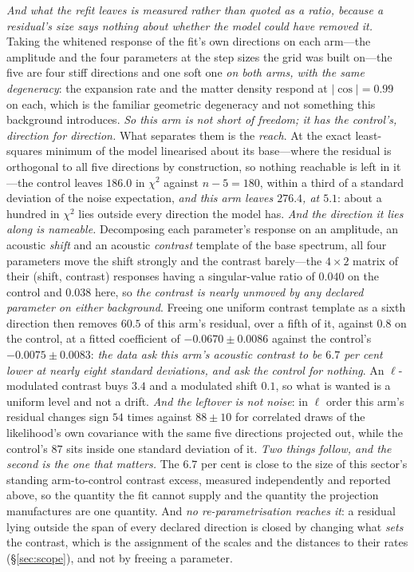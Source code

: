 \documentclass[11pt,a4paper]{article}
\theoremstyle{plain}
\theoremstyle{definition}
\theoremstyle{remark}
\begin{document}
\emph{And what the refit leaves is measured rather than quoted as a ratio, because a residual's size says
nothing about whether the model could have removed it.} Taking the whitened response of the fit's own
directions on each arm---the amplitude and the four parameters at the step sizes the grid was built on---the
five are four stiff directions and one soft one \emph{on both arms, with the same degeneracy}: the expansion
rate and the matter density respond at $\lvert\cos\rvert=0.99$ on each, which is the familiar geometric
degeneracy and not something this background introduces. \emph{So this arm is not short of freedom; it has the
control's, direction for direction.} What separates them is the \emph{reach}. At the exact least-squares
minimum of the model linearised about its base---where the residual is orthogonal to all five directions by
construction, so nothing reachable is left in it---the control leaves $186.0$ in $\chi^2$ against $n-5=180$,
within a third of a standard deviation of the noise expectation, \emph{and this arm leaves $276.4$, at
$5.1$}: about a hundred in $\chi^2$ lies outside every direction the model has. \emph{And the direction it
lies along is nameable.} Decomposing each parameter's response on an amplitude, an acoustic \emph{shift} and
an acoustic \emph{contrast} template of the base spectrum, all four parameters move the shift strongly and the
contrast barely---the $4\times2$ matrix of their (shift, contrast) responses having a singular-value ratio of
$0.040$ on the control and $0.038$ here, so \emph{the contrast is nearly unmoved by any declared parameter on
either background}. Freeing one uniform contrast template as a sixth direction then removes $60.5$ of this
arm's residual, over a fifth of it, against $0.8$ on the control, at a fitted coefficient of
$-0.0670\pm0.0086$ against the control's $-0.0075\pm0.0083$: \emph{the data ask this arm's acoustic contrast
to be $6.7$ per cent lower at nearly eight standard deviations, and ask the control for nothing}. An
$\ell$-modulated contrast buys $3.4$ and a modulated shift $0.1$, so what is wanted is a uniform level and not
a drift. \emph{And the leftover is not noise}: in $\ell$ order this arm's residual changes sign $54$ times
against $88\pm10$ for correlated draws of the likelihood's own covariance with the same five directions
projected out, while the control's $87$ sits inside one standard deviation of
it.
\emph{Two things follow, and the second is the one that matters.} The $6.7$ per cent is close to the size of this
sector's standing arm-to-control contrast excess, measured independently and reported above, so the quantity
the fit cannot supply and the quantity the projection manufactures are one quantity. And \emph{no
re-parametrisation reaches it}: a residual lying outside the span of every declared direction is closed by
changing what \emph{sets} the contrast, which is the assignment of the scales and the distances to their rates
(\S\ref{sec:scope}), and not by freeing a parameter.
\end{document}
